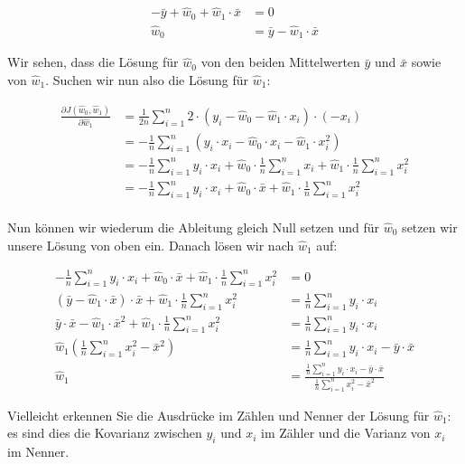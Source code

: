 \documentclass[
]{book}
\begin{document}
\begin{align}
-\bar{y} + \hat{w}_0 + \hat{w}_1 \cdot \bar{x} &= 0 \\
\hat{w}_0 &= \bar{y} - \hat{w}_1 \cdot \bar{x}
\end{align}

Wir sehen, dass die Lösung für \(\hat{w}_0\) von den beiden Mittelwerten \(\bar{y}\) und \(\bar{x}\) sowie von \(\hat{w}_1\). Suchen wir nun also die Lösung für \(\hat{w}_1\):

\begin{align}
\frac{\partial J(\hat{w}_0, \hat{w}_1)}{\partial \hat{w}_1} &= \frac{1}{2n} \sum_{i=1}^{n} 2 \cdot \left(y_i - \hat{w}_0 - \hat{w}_1 \cdot x_i \right) \cdot (-x_i) \\
&= -\frac{1}{n} \sum_{i=1}^{n} \left(y_i \cdot x_i - \hat{w}_0 \cdot x_i - \hat{w}_1 \cdot x_i^2 \right) \\
&= -\frac{1}{n} \sum_{i=1}^{n} y_i \cdot x_i + \hat{w}_0 \cdot \frac{1}{n} \sum_{i=1}^{n} x_i + \hat{w}_1 \cdot \frac{1}{n} \sum_{i=1}^{n} x_i^2 \\
&= -\frac{1}{n} \sum_{i=1}^{n} y_i \cdot x_i + \hat{w}_0 \cdot \bar{x} + \hat{w}_1 \cdot \frac{1}{n} \sum_{i=1}^{n} x_i^2 \\
\end{align}

Nun können wir wiederum die Ableitung gleich Null setzen und für \(\hat{w}_0\) setzen wir unsere Lösung von oben ein. Danach lösen wir nach \(\hat{w}_1\) auf:

\begin{align}
-\frac{1}{n} \sum_{i=1}^{n} y_i \cdot x_i + \hat{w}_0 \cdot \bar{x} + \hat{w}_1 \cdot \frac{1}{n} \sum_{i=1}^{n} x_i^2 &= 0 \\
(\bar{y} - \hat{w}_1 \cdot \bar{x}) \cdot \bar{x} + \hat{w}_1 \cdot \frac{1}{n} \sum_{i=1}^{n} x_i^2 &= \frac{1}{n} \sum_{i=1}^{n} y_i \cdot x_i \\
\bar{y} \cdot \bar{x} - \hat{w}_1 \cdot \bar{x}^2 + \hat{w}_1 \cdot \frac{1}{n} \sum_{i=1}^{n} x_i^2 &= \frac{1}{n} \sum_{i=1}^{n} y_i \cdot x_i \\
\hat{w}_1 \left(\frac{1}{n} \sum_{i=1}^{n} x_i^2 - \bar{x}^2 \right) &= \frac{1}{n} \sum_{i=1}^{n} y_i \cdot x_i - \bar{y} \cdot \bar{x} \\
\hat{w}_1 &= \frac{\frac{1}{n} \sum_{i=1}^{n} y_i \cdot x_i - \bar{y} \cdot \bar{x}}{\frac{1}{n} \sum_{i=1}^{n} x_i^2 - \bar{x}^2}
\end{align}

Vielleicht erkennen Sie die Ausdrücke im Zählen und Nenner der Lösung für \(\hat{w}_1\): es sind dies die Kovarianz zwischen \(y_i\) und \(x_i\) im Zähler und die Varianz von \(x_i\) im Nenner.
\end{document}
